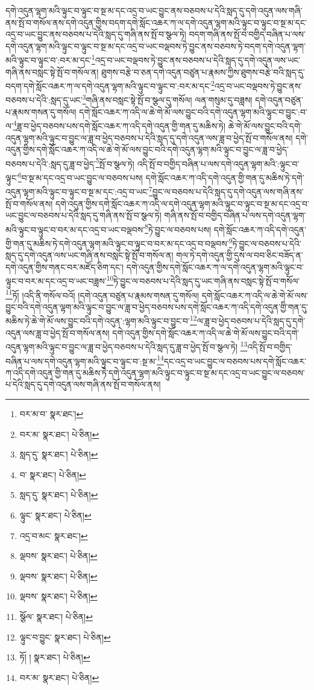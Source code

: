 དགེ་འདུན་ལྷག་མའི་ལྟུང་བ་ལྟུང་བ་སྔ་མ་དང་འདྲ་བ་ཡང་བྱུང་ནས་བཅབས་པ་དེའི་སླད་དུ་དགེ་འདུན་ལས་གཞི་ནས་སྤོ་བ་གསོལ་ནས་དགེ་འདུན་གྱིས་བདག་དགེ་སློང་འཆར་ཀ་ལ་དགེ་འདུན་ལྷག་མའི་ལྟུང་བ་ལྟུང་བ་སྔ་མ་དང་འདྲ་བ་ཡང་བྱུང་ནས་བཅབས་པ་དེའི་སླད་དུ་གཞི་ནས་སྤོ་བ་སྩལ་ཏེ། བདག་གཞི་ནས་སྤོ་བ་བགྱིད་བཞིན་པ་ལས་དགེ་འདུན་ལྷག་མའི་ལྟུང་བ་ལྟུང་བ་སྔ་མ་དང་འདྲ་བ་ཡང་བལྡབས་ཏེ་བྱུང་ནས་བཅབས་ཏེ་བདག་དགེ་འདུན་ལྷག་མའི་ལྟུང་བ་ལྟུང་བ་:བར་མ་དང་\footnote{བར་མ་བ་  སྣར་ཐང་། }འདྲ་བ་ཡང་བལྡབས་ཏེ་བྱུང་ནས་བཅབས་པ་དེའི་སླད་དུ་དགེ་འདུན་ལས་ཡང་གཞི་ནས་བསླང་སྟེ་སྤོ་བ་གསོལ་ན། ཐུགས་བརྩེ་བ་ཅན་དགེ་འདུན་བཙུན་པ་རྣམས་ཀྱིས་ཐུགས་བརྩེ་བའི་སླད་དུ་བདག་དགེ་སློང་འཆར་ཀ་ལ་དགེ་འདུན་ལྷག་མའི་ལྟུང་བ་ལྟུང་བ་:བར་མ་དང་\footnote{བར་མ་  སྣར་ཐང་།  པེ་ཅིན། }འདྲ་བ་ཡང་བལྡབས་ཏེ་བྱུང་ནས་བཅབས་པ་དེའི་:སླད་དུ་ཡང་\footnote{སླད་དུ་  སྣར་ཐང་།  པེ་ཅིན། }གཞི་ནས་བསླང་སྟེ་སྤོ་བ་སྩལ་དུ་གསོལ། ལན་གསུམ་དུ་བཟླས། དགེ་འདུན་བཙུན་པ་རྣམས་གསན་དུ་གསོལ། དགེ་སློང་འཆར་ཀ་འདི་ལ་ཆེ་གེ་མོ་ལས་བྱུང་བའི་དགེ་འདུན་ལྷག་མའི་ལྟུང་བ་བྱུང་:བ་ལ་\footnote{བ་  སྣར་ཐང་།  པེ་ཅིན། }ཟླ་བ་ཕྱེད་བཅབས་པས་དགེ་སློང་འཆར་ཀ་འདི་དགེ་འདུན་གྱི་གན་དུ་མཆིས་ཏེ། ཆེ་གེ་མོ་ལས་བྱུང་བའི་དགེ་འདུན་ལྷག་མའི་ལྟུང་བ་བྱུང་ལ་ཟླ་བ་ཕྱེད་བཅབས་པ་དེའི་སླད་དུ་དགེ་འདུན་ལས་ཟླ་བ་ཕྱེད་སྤོ་བ་གསོལ་ནས། དགེ་འདུན་གྱིས་དགེ་སློང་འཆར་ཀ་འདི་ལ་ཆེ་གེ་མོ་ལས་བྱུང་བའི་དགེ་འདུན་ལྷག་མའི་ལྟུང་བ་བྱུང་ལ་ཟླ་བ་ཕྱེད་བཅབས་པ་དེའི་:སླད་དུ་ཟླ་བ་ཕྱེད་\footnote{སླད་དུ་  སྣར་ཐང་།  པེ་ཅིན། }སྤོ་བ་སྩལ་ཏེ། འདི་སྤོ་བ་བགྱིད་བཞིན་པ་ལས་དགེ་འདུན་ལྷག་མའི་:ལྟུང་བ་ལྟུང་\footnote{ལྟུང་  སྣར་ཐང་།  པེ་ཅིན། }བ་སྔ་མ་དང་འདྲ་བ་ཡང་བྱུང་ལ་བཅབས་པས། དགེ་སློང་འཆར་ཀ་འདི་དགེ་འདུན་གྱི་གན་དུ་མཆིས་ཏེ་དགེ་འདུན་ལྷག་མའི་ལྟུང་བ་ལྟུང་བ་སྔ་མ་དང་:འདྲ་བ་ཡང་\footnote{འདྲ་བ་མང་  སྣར་ཐང་། }བྱུང་ལ་བཅབས་པ་དེའི་སླད་དུ་དགེ་འདུན་ལས་གཞི་ནས་སྤོ་བ་གསོལ་ནས། དགེ་འདུན་གྱིས་དགེ་སློང་འཆར་ཀ་འདི་ལ་དགེ་འདུན་ལྷག་མའི་ལྟུང་བ་ལྟུང་བ་སྔ་མ་དང་འདྲ་བ་ཡང་བྱུང་ལ་བཅབས་པ་དེའི་སླད་དུ་གཞི་ནས་སྤོ་བ་སྩལ་ཏེ། གཞི་ནས་སྤོ་བ་བགྱིད་བཞིན་པ་ལས་དགེ་འདུན་ལྷག་མའི་ལྟུང་བ་ལྟུང་བ་བར་མ་དང་འདྲ་བ་ཡང་བལྡབས་\footnote{ལྡབས་  སྣར་ཐང་།  པེ་ཅིན། }ཏེ་བྱུང་ལ་བཅབས་པས། དགེ་སློང་འཆར་ཀ་འདི་དགེ་འདུན་གྱི་གན་དུ་མཆིས་ཏེ་དགེ་འདུན་ལྷག་མའི་ལྟུང་བ་ལྟུང་བ་བར་མ་དང་འདྲ་བ་བལྡབས་\footnote{ལྡབས་  སྣར་ཐང་།  པེ་ཅིན། }ཏེ་བྱུང་ལ་བཅབས་པ་དེའི་སླད་དུ་དགེ་འདུན་ལས་ཡང་གཞི་ནས་བསླང་སྟེ་སྤོ་བ་གསོལ་ན། གལ་ཏེ་དགེ་འདུན་གྱི་དུས་ལ་བབ་ཅིང་བཟོད་ན་དགེ་འདུན་གྱིས་གནང་བར་མཛོད་ཅིག་དང་། དགེ་འདུན་གྱིས་དགེ་སློང་འཆར་ཀ་ལ་དགེ་འདུན་ལྷག་མའི་ལྟུང་བ་ལྟུང་བ་བར་མ་དང་འདྲ་བ་ཡང་བཟླས་\footnote{ལྡབས་  སྣར་ཐང་།  པེ་ཅིན། }ཏེ་བྱུང་ལ་བཅབས་པ་དེའི་སླད་དུ་ཡང་གཞི་ནས་བསླང་སྟེ་སྤོ་བ་གསོལ་\footnote{སྩོལ་  སྣར་ཐང་།  པེ་ཅིན། }ཏོ། །འདི་ནི་གསོལ་བའོ། །དགེ་འདུན་བཙུན་པ་རྣམས་གསན་དུ་གསོལ། དགེ་སློང་འཆར་ཀ་འདི་ལ་ཆེ་གེ་མོ་ལས་བྱུང་བའི་དགེ་འདུན་ལྷག་མའི་ལྟུང་བ་བྱུང་ལ་ཟླ་བ་ཕྱེད་བཅབས་པས་དགེ་སློང་འཆར་ཀ་འདི་དགེ་འདུན་གྱི་གན་དུ་མཆིས་ཏེ་ཆེ་གེ་མོ་ལས་བྱུང་བའི་དགེ་འདུན་:ལྷག་མའི་ལྟུང་བ་བྱུང་བ་\footnote{ལྟུང་བ་བྱུང་  སྣར་ཐང་།  པེ་ཅིན། }ལ་ཟླ་བ་ཕྱེད་བཅབས་པ་དེའི་སླད་དུ་དགེ་འདུན་ལས་ཟླ་བ་ཕྱེད་སྤོ་བ་གསོལ་ནས། དགེ་འདུན་གྱིས་དགེ་སློང་འཆར་ཀ་འདི་ལ་ཆེ་གེ་མོ་ལས་བྱུང་བའི་དགེ་འདུན་ལྷག་མའི་ལྟུང་བ་བྱུང་ལ་ཟླ་བ་ཕྱེད་བཅབས་པ་དེའི་སླད་དུ་ཟླ་བ་ཕྱེད་སྤོ་བ་སྩལ་ཏེ། \footnote{ཏོ། །   སྣར་ཐང་།  པེ་ཅིན། }འདི་སྤོ་བ་བགྱིད་བཞིན་པ་ལས་དགེ་འདུན་ལྷག་མའི་ལྟུང་བ་ལྟུང་བ་:སྔ་མ་\footnote{བར་མ་  སྣར་ཐང་།  པེ་ཅིན། }དང་འདྲ་བ་ཡང་བྱུང་ལ་བཅབས་པས་དགེ་སློང་འཆར་ཀ་འདི་དགེ་འདུན་གྱི་གན་དུ་མཆིས་ཏེ་དགེ་འདུན་ལྷག་མའི་ལྟུང་བ་ལྟུང་བ་སྔ་མ་དང་འདྲ་བ་ཡང་བྱུང་ལ་བཅབས་པ་དེའི་སླད་དུ་དགེ་འདུན་ལས་གཞི་ནས་སྤོ་བ་གསོལ་ནས། 